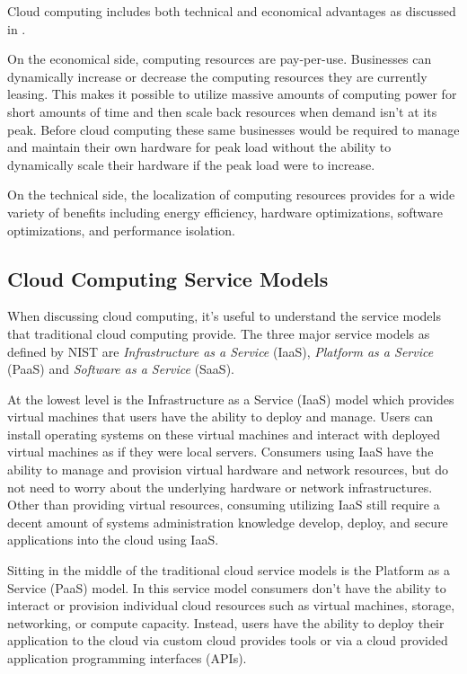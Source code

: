 \documentclass[]{article}
\begin{document}
Cloud computing includes both technical and economical advantages as discussed in \cite{botta_integration_2016}. 

On the economical side, computing resources are pay-per-use. Businesses can dynamically increase or decrease the computing resources they are currently leasing. This makes it possible to utilize massive amounts of computing power for short amounts of time and then scale back resources when demand isn't at its peak. Before cloud computing these same businesses would be required to manage and maintain their own hardware for peak load without the ability to dynamically scale their hardware if the peak load were to increase.

On the technical side, the localization of computing resources provides for a wide variety of benefits including energy efficiency, hardware optimizations, software optimizations, and performance isolation. 

\subsection{Cloud Computing Service Models} \label{ssec:cloud-computing-service-models}
When discussing cloud computing, it's useful to understand the service models that traditional cloud computing provide. The three major service models as defined by NIST\cite{mell2011nist} are \textit{Infrastructure as a Service} (IaaS), \textit{Platform as a Service} (PaaS) and \textit{Software as a Service} (SaaS).

At the lowest level is  the Infrastructure as a Service (IaaS) model which provides virtual machines that users have the ability to  deploy and manage. Users can install operating systems on these virtual machines and interact with deployed virtual machines as if they were local servers.  Consumers using IaaS have the ability to manage and provision virtual hardware and network resources, but do not need to worry about the underlying hardware or network infrastructures. Other than providing virtual resources, consuming utilizing IaaS still require a decent amount of systems administration knowledge develop, deploy, and secure applications into the cloud using IaaS.

Sitting in the middle of the traditional cloud service models is the Platform as a Service (PaaS)  model. In this service model consumers don't have the ability to interact or provision individual cloud resources such as virtual machines, storage, networking, or compute capacity. Instead, users have the ability to deploy their application to the cloud via custom cloud provides tools or via a cloud provided application programming interfaces (APIs).
\end{document}
